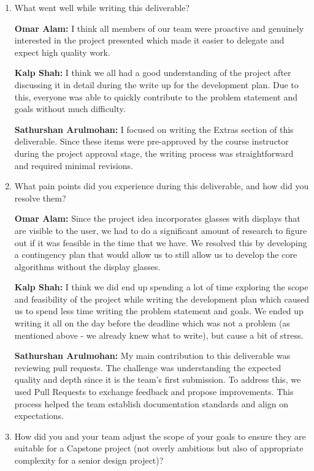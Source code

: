 \documentclass{article}
\begin{document}
\begin{enumerate}
    \item What went well while writing this deliverable? 
    
    \textbf{Omar Alam:} I think all members of our team were proactive and genuinely interested in the project presented which made it easier
    to delegate and expect high quality work. 
    
    \textbf{Kalp Shah:} I think we all had a good understanding of the project after discussing it in detail during
    the write up for the development plan. Due to this, everyone was able to quickly contribute to the problem statement
    and goals without much difficulty.

    \textbf{Sathurshan Arulmohan:} I focused on writing the Extras section of this deliverable.
    Since these items were pre-approved by the course instructor during the project approval stage, the writing process was straightforward and required minimal revisions.

    \item What pain points did you experience during this deliverable, and how
    did you resolve them?

    \textbf{Omar Alam:} Since the project idea incorporates glasses with displays that are visible to the user, we had to do a significant amount
    of research to figure out if it was feasible in the time that we have. We resolved this by developing a contingency plan that would allow us to 
    still allow us to develop the core algorithms without the display glasses.
    
    \textbf{Kalp Shah:} I think we did end up spending a lot of time exploring the scope and feasibility of the project while writing the development
    plan which caused us to spend less time writing the problem statement and goals. We ended up writing it all on the day before the deadline which
    was not a problem (as mentioned above - we already knew what to write), but cause a bit of stress.

    \textbf{Sathurshan Arulmohan:} My main contribution to this deliverable was reviewing pull requests.
    The challenge was understanding the expected quality and depth since it is the team's first submission.
    To address this, we used Pull Requests to exchange feedback and propose improvements.
    This process helped the team establish documentation standards and align on expectations.

    \item How did you and your team adjust the scope of your goals to ensure
    they are suitable for a Capstone project (not overly ambitious but also of
    appropriate complexity for a senior design project)?


\end{enumerate}
\end{document}
